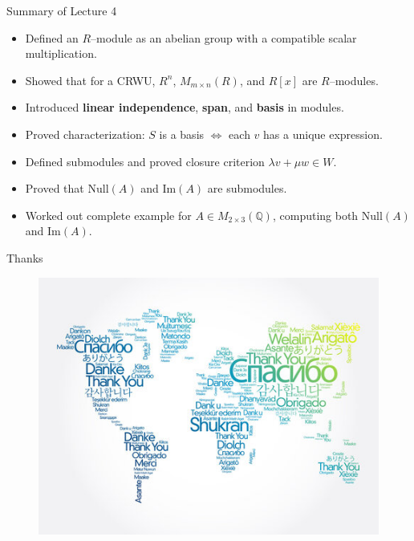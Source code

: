 \documentclass[11pt,aspectratio=43,ignorenonframetext,t]{beamer}
\newcounter{example_number} %
\begin{document}
\begin{frame}{Summary of Lecture 4}
\begin{itemize}
  \item Defined an $R$–module as an abelian group with a compatible scalar multiplication.
  \item Showed that for a CRWU, $R^n$, $M_{m\times n}(R)$, and $R[x]$ are $R$–modules.
  \item Introduced \textbf{linear independence}, \textbf{span}, and \textbf{basis} in modules.
  \item Proved characterization: $S$ is a basis $\iff$ each $v$ has a unique expression.
  \item Defined submodules and proved closure criterion $\lambda v+\mu w\in W$.
  \item Proved that $\mathrm{Null}(A)$ and $\mathrm{Im}(A)$ are submodules.
  \item Worked out complete example for $A\in M_{2\times3}(\mathbb{Q})$, computing both $\mathrm{Null}(A)$ and $\mathrm{Im}(A)$.
\end{itemize}
\end{frame}

\begin{frame}{Thanks}
    \begin{figure}
        \centering
        \includegraphics[width=0.85\linewidth]{Thanks.png}
    \end{figure}
\end{frame}
\end{document}
